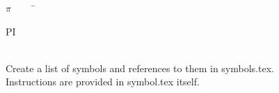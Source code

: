 \begin{tabbing}
$\pi$~~~~~\=\parbox{5in}{PI\dotfill \pageref{symbol:pi}}\\
Create a list of symbols and references to them in symbols.tex.\\
Instructions are provided in symbol.tex itself.
\end{tabbing}
\newpage
